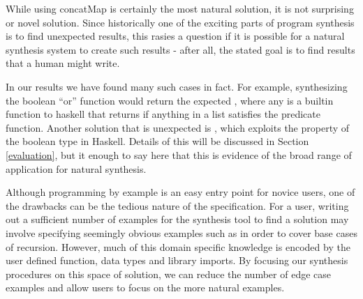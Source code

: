While using concatMap is certainly the most natural solution, it is not surprising or novel solution.
Since historically one of the exciting parts of program synthesis is to find unexpected results, this rasies a question if it is possible for a natural synthesis system to create such results - after all, the stated goal is to find results that a human might write.

In our results we have found many such cases in fact. For example, synthesizing the boolean ``or'' function would return the expected , where any is a builtin function to haskell that returns  if anything in a list satisfies the predicate function. Another solution that is unexpected is , which exploits the  property of the boolean type in Haskell. Details of this will be discussed in Section \ref{evaluation}, but it enough to say here that this is evidence of the broad range of application for natural synthesis.

Although programming by example is an easy entry point for novice users, one of the drawbacks can be the tedious nature of the specification. 
For a user, writing out a sufficient number of examples for the synthesis tool to find a solution may involve specifying seemingly obvious examples such as \codeinline{[]->[]} in order to cover base cases of recursion.
However, much of this domain specific knowledge is encoded by the user defined function, data types and library imports.
By focusing our synthesis procedures on this space of solution, we can reduce the number of edge case examples and allow users to focus on the more natural examples.
